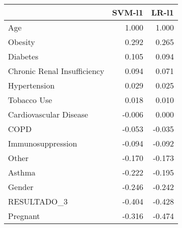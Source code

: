 \begin{tabular}{lrr}
\toprule
{} &  SVM-l1 &  LR-l1 \\
\midrule
Age                         &   1.000 &  1.000 \\
Obesity                     &   0.292 &  0.265 \\
Diabetes                    &   0.105 &  0.094 \\
Chronic Renal Insufficiency &   0.094 &  0.071 \\
Hypertension                &   0.029 &  0.025 \\
Tobacco Use                 &   0.018 &  0.010 \\
Cardiovascular Disease      &  -0.006 &  0.000 \\
COPD                        &  -0.053 & -0.035 \\
Immunosuppression           &  -0.094 & -0.092 \\
Other                       &  -0.170 & -0.173 \\
Asthma                      &  -0.222 & -0.195 \\
Gender                      &  -0.246 & -0.242 \\
RESULTADO\_3                 &  -0.404 & -0.428 \\
Pregnant                    &  -0.316 & -0.474 \\
\bottomrule
\end{tabular}
